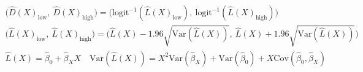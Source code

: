 \begin{gather*}
    \big(\hat{D}(X)_{\text{low}},~\hat{D}(X)_{\text{high}}\big)  =
    \big(
    \text{logit}^{-1}(\hat{L}(X)_{\text{low}}),~
    \text{logit}^{-1}(\hat{L}(X)_{\text{high}})
    \big)                                                       \\
    \big(\hat{L}(X)_{\text{low}},~\hat{L}(X)_{\text{high}}\big)  =
    \big(
    \hat{L}(X) - 1.96 \sqrt{\text{Var}(\hat{L}(X))},~
    \hat{L}(X) + 1.96 \sqrt{\text{Var}(\hat{L}(X))}
    \big)                                                       \\
    \hat{L}(X) = \hat{\beta}_0 + \hat{\beta}_XX \quad
    \text{Var}(\hat{L}(X)) = X^2\text{Var}(\hat{\beta}_X) + \text{Var}(\hat{\beta}_0) + X \text{Cov}(\hat{\beta}_0, \hat{\beta}_X)
\end{gather*}
